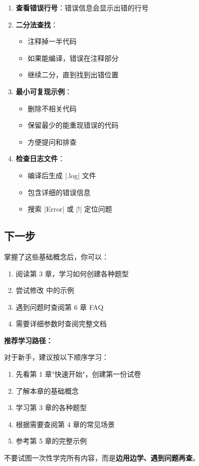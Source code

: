 \begin{enumerate}
  \item \textbf{查看错误行号}：错误信息会显示出错的行号

  \item \textbf{二分法查找}：
    \begin{itemize}
      \item 注释掉一半代码
      \item 如果能编译，错误在注释部分
      \item 继续二分，直到找到出错位置
    \end{itemize}

  \item \textbf{最小可复现示例}：
    \begin{itemize}
      \item 删除不相关代码
      \item 保留最少的能重现错误的代码
      \item 方便提问和排查
    \end{itemize}

  \item \textbf{检查日志文件}：
    \begin{itemize}
      \item 编译后生成 |.log| 文件
      \item 包含详细的错误信息
      \item 搜索 |Error| 或 |!| 定位问题
    \end{itemize}
\end{enumerate}


\subsection{下一步}

掌握了这些基础概念后，你可以：

\begin{enumerate}
  \item 阅读第 3 章，学习如何创建各种题型
  \item 尝试修改  中的示例
  \item 遇到问题时查阅第 6 章 FAQ
  \item 需要详细参数时查阅完整文档 
\end{enumerate}

\textbf{推荐学习路径：}

对于新手，建议按以下顺序学习：
\begin{enumerate}
  \item 先看第 1 章"快速开始"，创建第一份试卷
  \item 了解本章的基础概念
  \item 学习第 3 章的各种题型
  \item 根据需要查阅第 4 章的常见场景
  \item 参考第 5 章的完整示例
\end{enumerate}

不要试图一次性学完所有内容，而是\textbf{边用边学、遇到问题再查}。
